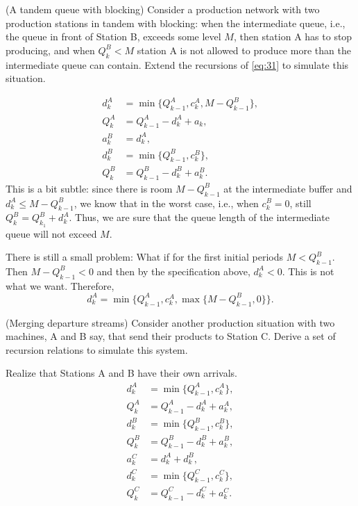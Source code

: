 \begin{exercise} (A tandem queue with blocking)
  Consider a production network with two production stations in tandem
  with blocking: when the intermediate queue, i.e., the queue in front of
  Station B, exceeds some level $M$, then station A has to stop
  producing, and when $Q^B_k < M$ station A is not allowed to produce
  more than the intermediate queue can contain. Extend the recursions
  of \eqref{eq:31} to simulate this situation.
\begin{solution}
\begin{equation}
  \begin{split}
    d^A_k &= \min\{Q_{k-1}^A, c_k^A, M-Q^B_{k-1}\}, \\
    Q_k^A &= Q_{k-1}^A -d_k^A + a_k, \\
    a_k^B &= d_{k}^A,\\
    d^B_k &= \min\{Q_{k-1}^B, c_k^B\}, \\
    Q_k^B &= Q_{k-1}^B -d_k^B + a_k^B.
  \end{split}
\end{equation}
This is a bit subtle: since there is room $M-Q^B_{k-1}$ at the
intermediate buffer and $d_k^A \leq M-Q^B_{k-1}$, we know that in the
worst case, i.e., when $c_k^B=0$, still $Q^B_k = Q_{k_1}^B +
d_k^A$.
Thus, we are sure that the queue length of the intermediate queue will
not exceed $M$.

There is still  a small problem: What if for the first initial periods  $M<Q^B_{k-1}$. Then $M-Q^B_{k-1}<0$ and then by the specification above, $d_k^A < 0$. This is not what we want. Therefore, 
\begin{equation*}
  d^A_k = \min\{Q_{k-1}^A, c_k^A, \max\{M-Q^B_{k-1}, 0\}\}.
\end{equation*}
\end{solution}
\end{exercise}

\begin{exercise} (Merging departure streams)
  Consider another production situation with two machines, A and B
  say, that send their products to Station C. Derive a set of
  recursion relations to simulate this system. 
\begin{solution}
Realize that Stations A and B have their own arrivals. 
\begin{equation}
  \begin{split}
    d^A_k &= \min\{Q_{k-1}^A, c_k^A\}, \\
    Q_k^A &= Q_{k-1}^A -d_k^A + a_k^A, \\
    d^B_k &= \min\{Q_{k-1}^B, c_k^B\}, \\
    Q_k^B &= Q_{k-1}^B -d_k^B + a_k^B, \\
    a_k^C &= d_{k}^A+d_{k}^B,\\
    d^C_k &= \min\{Q_{k-1}^C, c_k^C\}, \\
    Q_k^C &= Q_{k-1}^C -d_k^C + a_k^C.
  \end{split}
\end{equation}
\end{solution}
\end{exercise}


